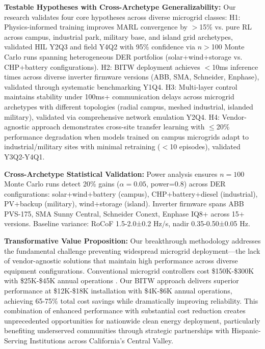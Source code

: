 \documentclass[12pt]{article}
\begin{document}
\textbf{Testable Hypotheses with Cross-Archetype Generalizability:} Our research validates four core hypotheses across diverse microgrid classes: H1: Physics-informed training improves MARL convergence by $>$15\% vs. pure RL across campus, industrial park, military base, and island grid archetypes, validated HIL Y2Q3 and field Y4Q2 with 95\% confidence via $n$$>$100 Monte Carlo runs spanning heterogeneous DER portfolios (solar+wind+storage vs. CHP+battery configurations). H2: BITW deployment achieves $<$10ms inference times across diverse inverter firmware versions (ABB, SMA, Schneider, Enphase), validated through systematic benchmarking Y1Q4. H3: Multi-layer control maintains stability under 100ms+ communication delays across microgrid archetypes with different topologies (radial campus, meshed industrial, islanded military), validated via comprehensive network emulation Y2Q4. H4: Vendor-agnostic approach demonstrates cross-site transfer learning with $\leq$20\% performance degradation when models trained on campus microgrids adapt to industrial/military sites with minimal retraining ($<$10 episodes), validated Y3Q2-Y4Q1.

\textbf{Cross-Archetype Statistical Validation:} Power analysis ensures $n=100$ Monte Carlo runs detect 20\% gains ($\alpha=0.05$, power=0.8) across DER configurations: solar+wind+battery (campus), CHP+battery+diesel (industrial), PV+backup (military), wind+storage (island). Inverter firmware spans ABB PVS-175, SMA Sunny Central, Schneider Conext, Enphase IQ8+ across 15+ versions. Baseline variance: RoCoF 1.5-2.0±0.2 Hz/s, nadir 0.35-0.50±0.05 Hz.

\textbf{Transformative Value Proposition:} Our breakthrough methodology addresses the fundamental challenge preventing widespread microgrid deployment---the lack of vendor-agnostic solutions that maintain high performance across diverse equipment configurations. Conventional microgrid controllers cost \$150K-\$300K with \$25K-\$45K annual operations \cite{hirsch2018,sigrin2019}. Our BITW approach delivers superior performance at \$12K-\$18K installation with \$4K-\$6K annual operations, achieving 65-75\% total cost savings while dramatically improving reliability. This combination of enhanced performance with substantial cost reduction creates unprecedented opportunities for nationwide clean energy deployment, particularly benefiting underserved communities through strategic partnerships with Hispanic-Serving Institutions across California's Central Valley.
\end{document}
